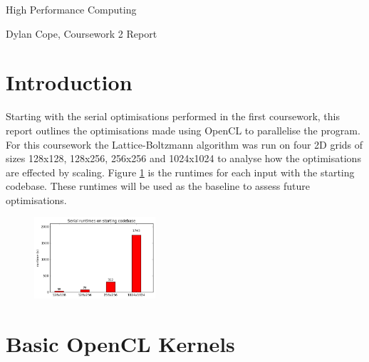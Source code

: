 \documentclass[12pt, a4paper]{article}
\begin{document}
  \vspace{.1in}
	\begin{center}
	{ \Large High Performance Computing }

  \end{center}
  \begin{center}

	Dylan Cope, Coursework 2 Report

	\vspace{.1in}

	\end{center}

  \section*{Introduction}

  \begin{multicols}{2}

    Starting with the serial optimisations performed in the first coursework, this report outlines the optimisations made using OpenCL to parallelise the program. For this coursework the Lattice-Boltzmann algorithm was run on four 2D grids of sizes 128x128, 128x256, 256x256 and 1024x1024 to analyse how the optimisations are effected by scaling. Figure \ref{serial} is the runtimes for each input with the starting codebase. These runtimes will be used as the baseline to assess future optimisations.

    \begin{figure}[H]
      \caption{} \vspace{-0.8cm}
      \label{serial}
      \begin{center}
        \includegraphics[width=0.4\textwidth]{figures/serial}
      \end{center}
    \end{figure}

  \end{multicols}
  
  \section*{Basic OpenCL Kernels}
\end{document}

